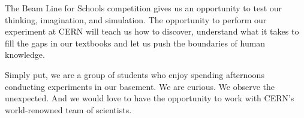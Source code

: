\documentclass[12pt,letterpaper]{article}
\begin{document}
The Beam Line for Schools competition gives us an opportunity to test our thinking, imagination, and simulation. 
The opportunity to perform our experiment at CERN will teach us how to discover, understand what it takes to fill the gaps in our textbooks and let us push the boundaries of human knowledge.

Simply put, we are a group of students who enjoy spending afternoons conducting experiments in our basement. We are curious. We observe the unexpected.
And we would love to have the opportunity to work with CERN’s world-renowned team of scientists.
\end{document}
